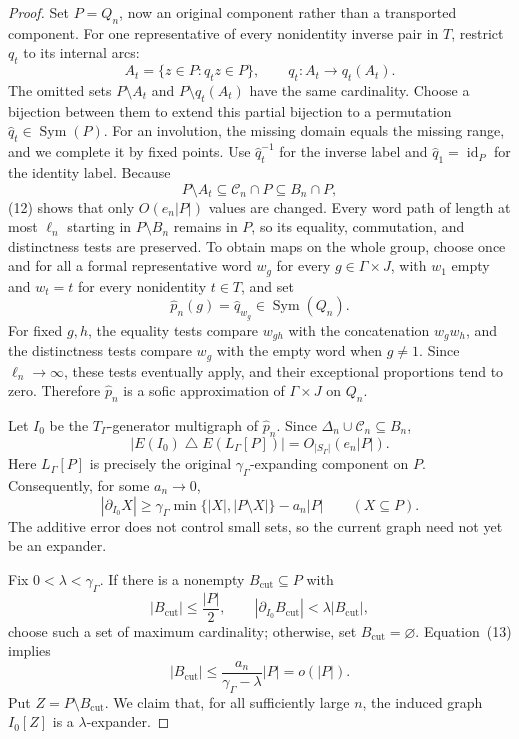 \documentclass[10pt]{article}
\newcommand{\Sym}{\operatorname{Sym}}
\newcommand{\id}{\operatorname{id}}
\newcommand{\abs}[1]{\left|#1\right|}
\begin{document}
\begin{proof}
Set $P=Q_n$, now an original component rather than a transported component. For one representative of every nonidentity inverse pair in $T$, restrict $q_t$ to its internal arcs:
\[
A_t=\{z\in P:q_tz\in P\},\qquad q_t:A_t\longrightarrow q_t(A_t).
\]
The omitted sets $P\setminus A_t$ and $P\setminus q_t(A_t)$ have the same cardinality. Choose a bijection between them to extend this partial bijection to a permutation $\widehat q_t\in\Sym(P)$. For an involution, the missing domain equals the missing range, and we complete it by fixed points. Use $\widehat q_t^{-1}$ for the inverse label and $\widehat q_1=\id_P$ for the identity label. Because
\[
P\setminus A_t\subseteq\mathcal C_n\cap P\subseteq B_n\cap P,
\]
(12) shows that only $O(e_n\abs{P})$ values are changed. Every word path of length at most $\ell_n$ starting in $P\setminus B_n$ remains in $P$, so its equality, commutation, and distinctness tests are preserved. To obtain maps on the whole group, choose once and for all a formal representative word $w_g$ for every $g\in\Gamma\times J$, with $w_1$ empty and $w_t=t$ for every nonidentity $t\in T$, and set
\[
\widehat p_n(g)=\widehat q_{w_g}\in\Sym(Q_n).
\]
For fixed $g,h$, the equality tests compare $w_{gh}$ with the concatenation $w_gw_h$, and the distinctness tests compare $w_g$ with the empty word when $g\neq1$. Since $\ell_n\to\infty$, these tests eventually apply, and their exceptional proportions tend to zero. Therefore $\widehat p_n$ is a sofic approximation of $\Gamma\times J$ on $Q_n$.

Let $I_0$ be the $T_\Gamma$-generator multigraph of $\widehat p_n$. Since $\Delta_n\cup\mathcal C_n\subseteq B_n$,
\[
\abs{E(I_0)\mathbin{\triangle}E(L_\Gamma[P])}=O_{\abs{S_\Gamma}}(e_n\abs{P}).
\]
Here $L_\Gamma[P]$ is precisely the original $\gamma_\Gamma$-expanding component on $P$. Consequently, for some $a_n\to0$,
\begin{equation}
\abs{\partial_{I_0}X}\geq\gamma_\Gamma\min\{\abs{X},\abs{P\setminus X}\}-a_n\abs{P}\qquad(X\subseteq P).
\tag{13}
\end{equation}
The additive error does not control small sets, so the current graph need not yet be an expander.

Fix $0<\lambda<\gamma_\Gamma$. If there is a nonempty $B_{\mathrm{cut}}\subseteq P$ with
\[
\abs{B_{\mathrm{cut}}}\leq\frac{\abs{P}}2,\qquad \abs{\partial_{I_0}B_{\mathrm{cut}}}<\lambda\abs{B_{\mathrm{cut}}},
\]
choose such a set of maximum cardinality; otherwise, set $B_{\mathrm{cut}}=\varnothing$. Equation~(13) implies
\[
\abs{B_{\mathrm{cut}}}\leq\frac{a_n}{\gamma_\Gamma-\lambda}\abs{P}=o(\abs{P}).
\]
Put $Z=P\setminus B_{\mathrm{cut}}$. We claim that, for all sufficiently large $n$, the induced graph $I_0[Z]$ is a $\lambda$-expander.


\end{proof}
\end{document}
